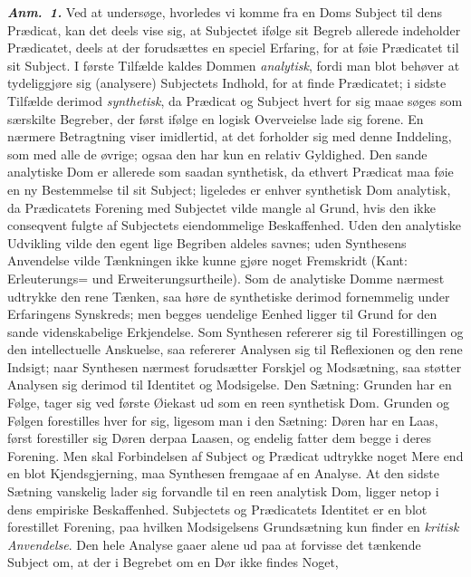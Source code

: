 \documentclass[12pt]{book}
\newcommand{\anm}[1]{\emph{\textbf{Anm.~#1.}}}
\newcommand{\opage}[1]{\marginnote{\footnotesize\textit{[#1]}}}
\begin{document}
\anm{1} Ved at undersøge, hvorledes vi komme fra en Doms Subject til dens
Prædicat, kan det deels vise sig, at Subjectet ifølge sit Begreb allerede
indeholder Prædicatet, deels at der forudsættes en speciel Erfaring, for at føie
Prædicatet til sit Subject. I første Tilfælde kaldes Dommen \emph{analytisk}, fordi
man blot behøver at tydeliggjøre sig (analysere) Subjectets Indhold, for at finde
Prædicatet; i sidste Tilfælde derimod \emph{synthetisk}, da Prædicat og Subject
hvert for sig maae søges som særskilte Begreber, der først ifølge en logisk
Overveielse lade sig forene. En nærmere Betragtning viser imidlertid, at det
forholder sig med denne Inddeling, som med alle de øvrige; ogsaa den har kun en
relativ Gyldighed. Den sande analytiske Dom er allerede som saadan synthetisk, da
ethvert Prædicat maa føie en ny Bestemmelse til sit Subject; ligeledes er enhver
synthetisk Dom analytisk, da Prædicatets Forening med Subjectet vilde mangle al
Grund, hvis den ikke conseqvent fulgte af Subjectets eiendommelige Beskaffenhed.
Uden den analytiske Udvikling vilde den egent%
\opage{57}lige Begriben aldeles savnes; uden Synthesens Anvendelse vilde Tænkningen ikke
kunne gjøre noget Fremskridt (Kant: Erleuterungs= und Erweiterungsurtheile). Som
de analytiske Domme nærmest udtrykke den rene Tænken, saa høre de synthetiske
derimod fornemmelig under Erfaringens Synskreds; men begges uendelige Eenhed
ligger til Grund for den sande videnskabelige Erkjendelse. Som Synthesen refererer
sig til Forestillingen og den intellectuelle Anskuelse, saa refererer Analysen sig
til Reflexionen og den rene Indsigt; naar Synthesen nærmest forudsætter Forskjel
og Modsætning, saa støtter Analysen sig derimod til Identitet og Modsigelse. Den
Sætning: Grunden har en Følge, tager sig ved første Øiekast ud som en reen
synthetisk Dom. Grunden og Følgen forestilles hver for sig, ligesom man i den
Sætning: Døren har en Laas, først forestiller sig Døren derpaa Laasen, og endelig
fatter dem begge i deres Forening. Men skal Forbindelsen af Subject og Prædicat
udtrykke noget Mere end en blot Kjendsgjerning, maa Synthesen fremgaae af en
Analyse. At den sidste Sætning vanskelig lader sig forvandle til en reen analytisk
Dom, ligger netop i dens empiriske Beskaffenhed. Subjectets og Prædicatets
Identitet er en blot forestillet Forening, paa hvilken Modsigelsens Grundsætning
kun finder en \emph{kritisk Anvendelse}. Den hele Analyse gaaer alene ud paa at
forvisse det tænkende Subject om, at der i Begrebet om en Dør ikke findes Noget,
\end{document}
